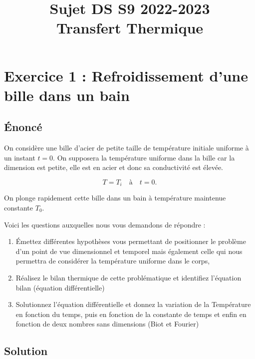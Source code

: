 \documentclass[12pt,a4paper]{article}
\title{Sujet DS S9 2022-2023 \\ Transfert Thermique}
\date{}
\author{}
\begin{document}
\maketitle

\section*{Exercice 1 : Refroidissement d'une bille dans un bain}

\subsection*{Énoncé}
On considère une bille d'acier de petite taille de température initiale uniforme à un instant \( t = 0 \).  
On supposera la température uniforme dans la bille car la dimension est petite, elle est en acier et donc sa conductivité est élevée.  

\[ T = T_i \quad \text{à} \quad t = 0. \]  

On plonge rapidement cette bille dans un bain à température maintenue constante \( T_0 \).

Voici les questions auxquelles nous vous demandons de répondre :
\begin{enumerate}
    \item Émettez différentes hypothèses vous permettant de positionner le problème d'un point de vue dimensionnel et temporel mais également celle qui nous permettra de considérer la température uniforme dans le corps,
    \item Réalisez le bilan thermique de cette problématique et identifiez l'équation bilan (équation différentielle)
    \item Solutionnez l'équation différentielle et donnez la variation de la Température en fonction du temps, puis en fonction de la constante de temps et enfin en fonction de deux nombres sans dimensions (Biot et Fourier)
\end{enumerate}

\subsection*{Solution}
\end{document}
